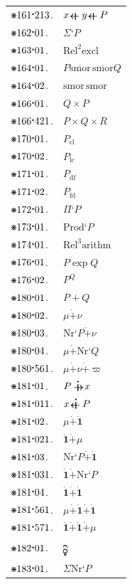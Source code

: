 \documentclass[12pt,openany,leqno,twocolumn]{book}
\newcommand{\pmast}{\text{\resizebox{!}{.75\height}{\ding{107}}}} %
\newcommand{\pmcdot}{\text{\raisebox{.05cm}{$\boldsymbol\cdot$}}} %
\newcommand{\pmbreve}[1]{\mathbf{\breve{\text{$#1$}}}}
\newcommand{\pmcirc}[1]{\mathbf{\dot{\text{$#1$}}}}
\newcommand{\Female}{{\usefont{U}{mvs}{m}{n}\symbol{126}}} %
\newcommand{\pmop}{\mathop{\text{\Female}}} %
\newcommand{\pmSmor}{\text{smor}}
\newcommand{\pmnr}[1]{\text{Nr}\textbf{`}#1} %
\newcommand{\pmNr}{\text{Nr}}
\newcommand{\pmRsum}{\mathrel{\ooalign{${\raise-.21ex\hbox{$\boldsymbol{-}$}}$\cr\hidewidth$\boldsymbol{\uparrow}$\hidewidth\cr${\raise-.19ex\hbox{$\boldsymbol{-}$}}$}}}
\newcommand{\pmrsume}[2]{#1 \mathrel{\rotatebox[origin=c]{90}{$\pmRsum$}} #2} %
\newcommand{\pmRsume}{\rotatebox[origin=c]{90}{$\pmRsum$} }
\newcommand{\pmRsumb}{\rotatebox[origin=c]{270}{$\pmRsum$}}
\newcommand{\pmrsumr}[1]{\Sigma\textbf{`}#1} %
\newcommand{\pmrsumrex}[1]{\mathrel{\text{Rel}^{#1}\text{excl}}} %
\newcommand{\pmsmorsmorb}[2]{#1 \mathrel{\overline{\text{smor}}\,\overline{\text{smor}}} #2} %
\newcommand{\pmSmorsmor}{\pmSmor\,\pmSmor}
\newcommand{\pmrprod}[2]{#1 \times #2} %
\newcommand{\pmRfdcl}[1]{#1_{\text{cl}}}
\newcommand{\pmRfdlc}[1]{#1_{\text{lc}}}
\newcommand{\pmRfddf}[1]{#1_{\text{df}}}
\newcommand{\pmRfdfd}[1]{#1_{\text{fd}}}
\newcommand{\pmrfprod}[1]{\Pi\textbf{`}#1} %
\newcommand{\pmRfprod}[1]{\text{Prod}\textbf{`}#1} %
\newcommand{\pmrarrel}[1]{\mathrel{\text{Rel}^{#1}\text{arithm}}} %
\newcommand{\pmrexp}{\mathrel{\text{exp}}} %
\newcommand{\pmRexp}[2]{{#1}^{#2}} %
\newcommand{\pmrnsum}[2]{{#1} + {#2}} %
\newcommand{\pmrndsum}[2]{{#1} \mathrel{\pmcirc{+}} {#2}} %
\newcommand{\pmrnsumru}[2]{#1 \mathrel{\pmcirc{\pmRsumb}} #2} %
\newcommand{\pmrnsumur}[2]{#1 \mathrel{\pmcirc{\pmRsume}} #2} %
\newcommand{\pmrn}[1]{\pmcirc{#1}} %
\newcommand{\pmrsep}[1]{\ooalign{${\raise1.5ex\hbox{\rotatebox[origin=c]{180}{\scalebox{1.4}[1.4]{$\pmbreve{\phantom{.}}$}}}}$\cr\hidewidth$#1$\hidewidth}} %
\newcommand{\pmrnsumf}[1]{\Sigma\pmNr\textbf{`}#1} %
\begin{document}
\begin{tabular}{l l}
	$\pmast161\pmcdot213$. & $\pmrsume{\pmrsume{x}{y}}{P}$ \\
	$\pmast162\pmcdot01$. & $\pmrsumr{P}$ \\
	$\pmast163\pmcdot01$. & $\pmrsumrex{2}$ \\
	$\pmast164\pmcdot01$. & $\pmsmorsmorb{P}{Q}$ \\
	$\pmast164\pmcdot02$. & $\pmSmorsmor$ \\
	$\pmast166\pmcdot01$. & $\pmrprod{Q}{P}$ \\
	$\pmast166\pmcdot421$. & $\pmrprod{P}{\pmrprod{Q}{R}}$ \\
	$\pmast170\pmcdot01$. & $\pmRfdcl{P}$ \\
	$\pmast170\pmcdot02$. & $\pmRfdlc{P}$ \\
	$\pmast171\pmcdot01$. & $\pmRfddf{P}$ \\
	$\pmast171\pmcdot02$. & $\pmRfdfd{P}$ \\
	$\pmast172\pmcdot01$. & $\pmrfprod{P}$ \\
	$\pmast173\pmcdot01$. & $\pmRfprod{P}$ \\
	$\pmast174\pmcdot01$. & $\pmrarrel{3}$ \\
	$\pmast176\pmcdot01$. & $P \pmrexp Q$ \\
	$\pmast176\pmcdot02$. & $\pmRexp{P}{Q}$ \\
	$\pmast180\pmcdot01$. & $\pmrnsum{P}{Q}$ \\
	$\pmast180\pmcdot02$. & $\pmrndsum{\mu}{\nu}$ \\
	$\pmast180\pmcdot03$. & $\pmrndsum{\pmnr{P}}{\nu}$ \\
	$\pmast180\pmcdot04$. & $\pmrndsum{\mu}{\pmnr{Q}}$ \\
	$\pmast180\pmcdot561$. & $\pmrndsum{\mu}{\pmrndsum{\nu}{\varpi}}$ \\
	$\pmast181\pmcdot01$. & $\pmrnsumru{P}{x}$ \\
	$\pmast181\pmcdot011$. & $\pmrnsumur{x}{P}$ \\
	$\pmast181\pmcdot02$. & $\pmrndsum{\mu}{\pmrn{1}}$ \\
	$\pmast181\pmcdot021$. & $\pmrndsum{\pmrn{1}}{\mu}$ \\
	$\pmast181\pmcdot03$. & $\pmrndsum{\pmnr{P}}{\pmrn{1}}$ \\
	$\pmast181\pmcdot031$. & $\pmrndsum{\pmrn{1}}{\pmnr{P}}$ \\
	$\pmast181\pmcdot04$. & $\pmrndsum{\pmrn{1}}{\pmrn{1}}$ \\
	$\pmast181\pmcdot561$. & $\pmrndsum{\mu}{\pmrndsum{\pmrn{1}}{\pmrn{1}}}$ \\
	$\pmast181\pmcdot571$. & $\pmrndsum{\pmrn{1}}{\pmrndsum{\pmrn{1}}{\mu}}$ \\
	$\pmast182\pmcdot01$. & $\pmrsep{\pmop}$ \\
	$\pmast183\pmcdot01$. & $\pmrnsumf{P}$ 
\end{tabular}
\end{document}
